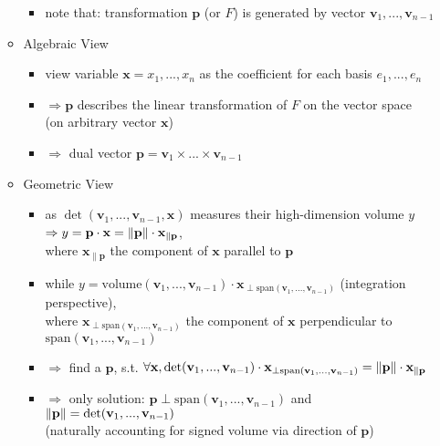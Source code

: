 \begin{itemize}
\begin{itemize}
\begin{itemize}
			\item note that: transformation $\mathbf p$ (or $F$) is generated by vector $\mathbf v_1,...,\mathbf v_{n-1}$
		\end{itemize}
	\item Algebraic View
		\begin{itemize}
		\item view variable $\mathbf x=x_1,...,x_n$ as the coefficient for each basis $e_1,...,e_n$
		\item $\Rightarrow \mathbf p$ describes the linear transformation of $F$ on the vector space \\
		(on arbitrary vector $\mathbf x$)
		\item $\Rightarrow$ dual vector $\mathbf p=\mathbf v_1\times...\times \mathbf v_{n-1}$
		\end{itemize}
	\item Geometric View
		\begin{itemize}
		\item as $\det(\mathbf v_1,...,\mathbf v_{n-1}, \mathbf x)$ measures their high-dimension volume $y$ \\
		$\Rightarrow y = \mathbf p \cdot\mathbf x = \lVert\mathbf p\rVert\cdot\mathbf x_{\parallel \mathbf p}$, \\
		where $\mathbf x_{\parallel \mathbf p}$ the component of $\mathbf x$ parallel to $\mathbf p$
		\item while $y = \text{volume}(\mathbf v_1,...,\mathbf v_{n-1})\cdot \mathbf x_{\perp \text{span}(\mathbf v_1,...,\mathbf v_{n-1})}$ (integration perspective), \\
		where $\mathbf x_{\perp \text{span}(\mathbf v_1,...,\mathbf v_{n-1})}$ the component of $\mathbf x$ perpendicular to $\text{span}(\mathbf v_1,...,\mathbf v_{n-1})$
		\item $\Rightarrow$ find a $\mathbf p$, s.t. $\forall \mathbf x, \det(\mathbf v_1,...,\mathbf v_{n-1})\cdot \mathbf x_{\perp \text{span}(\mathbf v_1,...,\mathbf v_{n-1})} = \lVert\mathbf p\rVert\cdot\mathbf x_{\parallel \mathbf p}$
		\item $\Rightarrow$ only solution: $\mathbf p\perp\text{span}(\mathbf v_1,...,\mathbf v_{n-1})$ and $\lVert\mathbf p\rVert = \det(\mathbf v_1,...,\mathbf v_{n-1})$ \\ 
		(naturally accounting for signed volume via direction of $\mathbf p$)
		\end{itemize} 
	\end{itemize}
\end{itemize}

